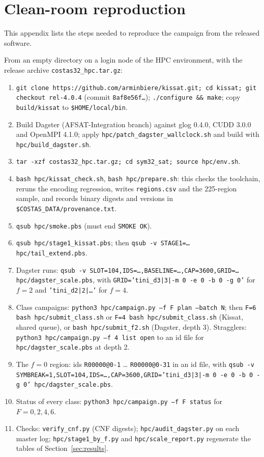 \documentclass[11pt,a4paper]{article}
\theoremstyle{definition}
\newcommand{\code}[1]{\texttt{#1}}
\begin{document}
\appendix
\section{Clean-room reproduction}\label{app:repro}
This appendix lists the steps needed to reproduce the campaign from the released software.

\begingroup\sloppy
From an empty directory on a login node of the HPC environment, with the release archive \code{costas32\_hpc.tar.gz}:
\begin{enumerate}[label=\arabic*.]
\item \code{git clone https://github.com/arminbiere/kissat.git; cd kissat; git checkout rel-4.0.4}
(commit \code{8af8e56f\ldots}); \code{./configure \&\& make}; copy \code{build/kissat} to
\code{\$HOME/local/bin}.
\item Build Dagster (AFSAT-Integration branch) against glog 0.4.0, CUDD 3.0.0 and OpenMPI 4.1.0;
apply \code{hpc/patch\_dagster\_wallclock.sh} and build with \code{hpc/build\_dagster.sh}.
\item \code{tar -xzf costas32\_hpc.tar.gz; cd sym32\_sat; source hpc/env.sh}.
\item \code{bash hpc/kissat\_check.sh}, \code{bash hpc/prepare.sh}: this checks the toolchain,
reruns the encoding regression, writes \code{regions.csv} and the 225-region sample, and records
binary digests and versions in \code{\$COSTAS\_DATA/provenance.txt}.
\item \code{qsub hpc/smoke.pbs} (must end \code{SMOKE OK}).
\item \code{qsub hpc/stage1\_kissat.pbs}; then \code{qsub -v STAGE1=\ldots{} hpc/tail\_extend.pbs}.
\item Dagster runs: \code{qsub -v SLOT=104,IDS=\ldots,BASELINE=\ldots,CAP=3600,GRID=\ldots{}
hpc/dagster\_scale.pbs}, with \code{GRID='tini\_d3|3|-m 0 -e 0 -b 0 -g 0'} for $f=2$ and
\code{'tini\_d2|2|\ldots'} for $f=4$.
\item Class campaigns: \code{python3 hpc/campaign.py --f F plan --batch N}; then
\code{F=6 bash hpc/submit\_class.sh} or \code{F=4 bash hpc/submit\_class.sh} (Kissat, shared
queue), or \code{bash hpc/submit\_f2.sh} (Dagster, depth 3). Stragglers:
\code{python3 hpc/campaign.py --f 4 list open} to an id file for \code{hpc/dagster\_scale.pbs}
at depth 2.
\item The $f=0$ region: ids \code{R00000@0-1} \ldots{} \code{R00000@0-31} in an id file, with
\code{qsub -v SYMBREAK=1,SLOT=104,IDS=\ldots,CAP=3600,GRID='tini\_d3|3|-m 0 -e 0 -b 0 -g 0'
hpc/dagster\_scale.pbs}.
\item Status of every class: \code{python3 hpc/campaign.py --f F status} for $F=0,2,4,6$.
\item Checks: \code{verify\_cnf.py} (CNF digests); \code{hpc/audit\_dagster.py} on each master
log; \code{hpc/stage1\_by\_f.py} and \code{hpc/scale\_report.py} regenerate the tables of
Section~\ref{sec:results}.
\end{enumerate}
\endgroup
\end{document}
